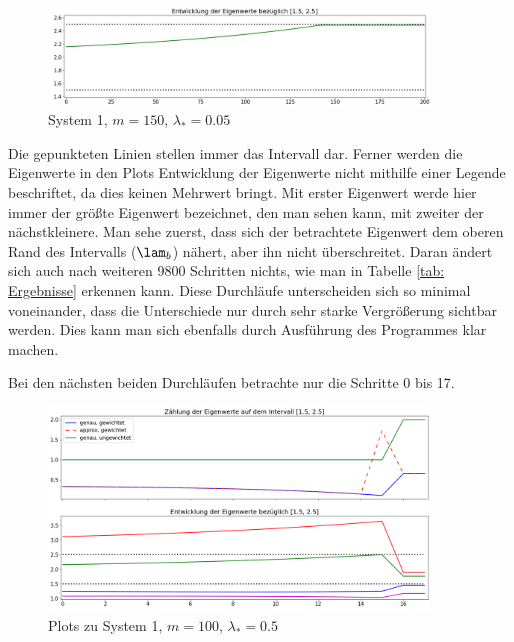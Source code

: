 \documentclass[a4paper,12pt]{report}
\newcommand{\zitat}[1]{\glqq #1\grqq}
\newcommand{\1}{\mathds{1}}
\theoremstyle{plain} %
\theoremstyle{definition} %
\theoremstyle{remark}
\begin{document}
            \begin{figure}[h!t]
                  \centering
                  \includegraphics[width=0.9\textwidth, keepaspectratio]{./Original/Plot_1_150_0.05.png}
                  \caption{System 1, $m=150$, $\lambda_*=0.05$}
                  \label{fig: Plot_1_150_0.05}
            \end{figure}

            Die gepunkteten Linien stellen immer das Intervall \lamAlamB dar.
            Ferner werden die Eigenwerte in den Plots \zitat{Entwicklung der Eigenwerte} nicht mithilfe einer Legende beschriftet, da dies keinen Mehrwert bringt.
            Mit erster Eigenwert werde hier immer der größte Eigenwert bezeichnet, den man sehen kann, mit zweiter der nächstkleinere.
            Man sehe zuerst, dass sich der betrachtete Eigenwert dem oberen Rand des Intervalls ($\lam_b$) nähert, aber ihn nicht überschreitet.
            Daran ändert sich auch nach weiteren 9800 Schritten nichts, wie man in Tabelle \ref{tab: Ergebnisse} erkennen kann.
            Diese Durchläufe unterscheiden sich so minimal voneinander, dass die Unterschiede nur durch sehr starke Vergrößerung sichtbar werden.
            Dies kann man sich ebenfalls durch Ausführung des Programmes klar machen.

            Bei den nächsten beiden Durchläufen betrachte nur die Schritte 0 bis 17. 

            \begin{figure}[h!t]
                  \centering
                  \includegraphics[width=0.9\textwidth, keepaspectratio]{./Original/Plot_1_100_0.5.png}
                  \caption{Plots zu System 1, $m=100$, $\lambda_*=0.5$}
                  \label{fig: Plot_1_100_0.5}
            \end{figure}
\end{document}
